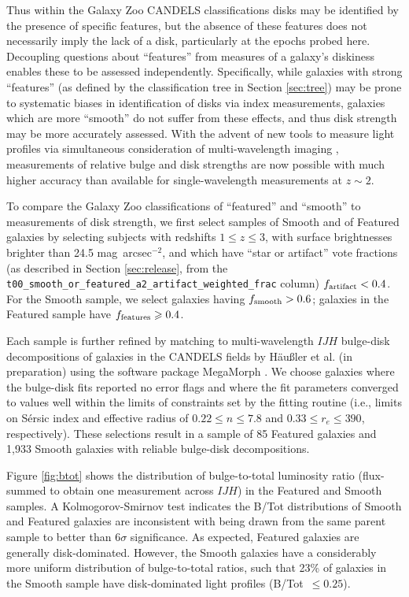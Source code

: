 \documentclass[useAMS,usenatbib]{mn2e}
\begin{document}
{Thus within the Galaxy Zoo CANDELS classifications disks may be identified by the presence of specific features, but the absence of these features does not necessarily imply the lack of a disk, particularly at the epochs probed here. Decoupling questions about ``features'' from measures of a galaxy's diskiness enables these to be assessed independently. Specifically, while galaxies with strong ``features'' (as defined by the classification tree in Section \ref{sec:tree}) may be prone to systematic biases in identification of disks via \citet{sersic68} index measurements, galaxies which are more ``smooth'' do not suffer from these effects, and thus disk strength may be more accurately assessed. With the advent of new tools to measure light profiles via simultaneous consideration of multi-wavelength imaging \citep{haeussler13}, measurements of relative bulge and disk strengths are now possible with much higher accuracy than available for single-wavelength measurements at $z \sim 2$. 

To compare the Galaxy Zoo classifications of ``featured'' and ``smooth'' to measurements of disk strength, we first select samples of Smooth and of Featured galaxies by selecting subjects with redshifts $1 \leq z \leq 3$, with surface brightnesses brighter than 24.5 mag~arcsec$^{-2}$, and which have ``star or artifact'' vote fractions (as described in Section \ref{sec:release}, from the {\small \tt t00\_smooth\_or\_featured\_a2\_artifact\_weighted\_frac} column) $f_{\rm artifact} < 0.4$. For the Smooth sample, we select galaxies having $f_{\rm smooth} > 0.6$; galaxies in the Featured sample have $f_{\rm features} \geq 0.4$.

Each sample is further refined by matching to multi-wavelength $IJH$ bulge-disk decompositions of galaxies in the CANDELS fields by H\"au\ss ler et al. (in preparation) using the software package MegaMorph \citep{haeussler13}. We choose galaxies where the bulge-disk fits reported no error flags and where the fit parameters converged to values well within the limits of constraints set by the fitting routine (i.e., limits on S\'ersic index and effective radius of $0.22 \leq n \leq 7.8$ and $0.33 \leq r_e \leq 390$, respectively). These selections result in a sample of 85 Featured galaxies and 1,933 Smooth galaxies with reliable bulge-disk decompositions.

Figure \ref{fig:btot} shows the distribution of bulge-to-total luminosity ratio (flux-summed to obtain one measurement across $IJH$) in the Featured and Smooth samples. A Kolmogorov-Smirnov test indicates the B/Tot distributions of Smooth and Featured galaxies are inconsistent with being drawn from the same parent sample to better than $6 \sigma$ significance. As expected, Featured galaxies are generally disk-dominated. However, the Smooth galaxies have a considerably more uniform distribution of bulge-to-total ratios, such that 23\% of galaxies in the Smooth sample have disk-dominated light profiles (B/Tot~$\leq 0.25$). 

}
\end{document}
